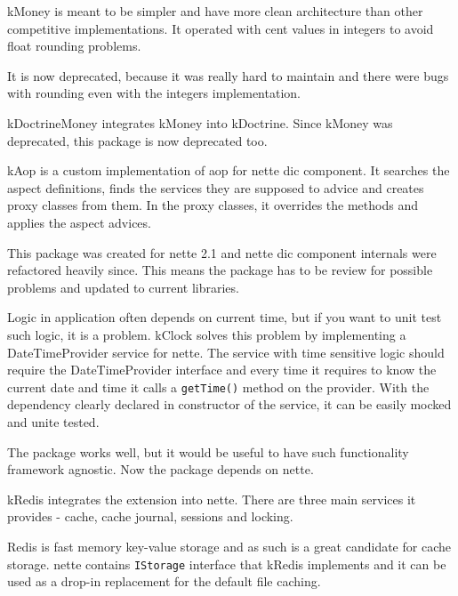 \gls{kMoney} is meant to be simpler and have more clean architecture than other competitive implementations. It operated with cent values in integers to avoid float rounding problems.

It is now deprecated, because it was really hard to maintain and there were bugs with rounding even with the integers implementation.

 \label{sec:state:doctrine-money}

\gls{kDoctrineMoney} integrates \gls{kMoney} into \gls{kDoctrine}. Since \gls{kMoney} was deprecated, this package is now deprecated too.

 \label{sec:state:aop}

\gls{kAop} is a custom implementation of \gls{aop} for \gls{nette} \gls{dic} component. It searches the aspect definitions, finds the services they are supposed to advice and creates proxy classes from them. In the proxy classes, it overrides the methods and applies the aspect advices.

This package was created for \gls{nette} 2.1 and \gls{nette} \gls{dic} component internals were refactored heavily since. This means the package has to be review for possible problems and updated to current libraries.

 \label{sec:state:clock}

Logic in application often depends on current time, but if you want to unit test such logic, it is a problem. \gls{kClock} solves this problem by implementing a DateTimeProvider service for \gls{nette}. The service with time sensitive logic should require the DateTimeProvider interface and every time it requires to know the current date and time it calls a \lstinline{getTime()} method on the provider. With the dependency clearly declared in constructor of the service, it can be easily mocked and unite tested.

The package works well, but it would be useful to have such functionality framework agnostic. Now the package depends on \gls{nette}.

 \label{sec:state:redis}

\gls{kRedis} integrates the  extension  into \gls{nette}. There are three main services it provides - cache, cache journal, sessions and locking.

Redis is fast memory key-value storage and as such is a great candidate for cache storage. \gls{nette} contains \lstinline{IStorage} interface that \gls{kRedis} implements and it can be used as a drop-in replacement for the default file caching.

